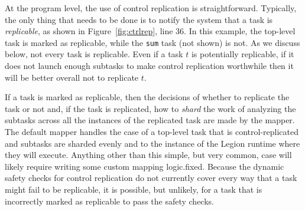 At the program level, the use of control replication is straightforward.  Typically,
the only thing that needs to be done is to notify the system that a task is {\em replicable},
as shown in Figure~\ref{fig:ctrlrep}, line 36.  In this example, the top-level
task is marked as replicable, while the {\tt sum} task (not shown) is not.
As we discuss below, not every task is replicable.  Even if a task $t$ is potentially
replicable, if it does not launch enough subtasks to make control replication
worthwhile then it will be better overall not to replicate $t$.

If a task is marked as replicable, then the decisions of whether to
replicate the task or not and, if the task is replicated, how to {\em
  shard} the work of analyzing the subtasks across all the instances
of the replicated task are made by the mapper.  The default mapper
handles the case of a top-level task that is control-replicated and
subtasks are sharded evenly and to the instance of the Legion runtime
where they will execute.  Anything other than this simple, but very
common, case will likely require writing some custom mapping
logic.fixed.  Because the dynamic safety checks for control
replication do not currently cover every way that a task
might fail to be replicable, it is possible, but unlikely, for a task that is
incorrectly marked as replicable to pass the safety checks.


    
